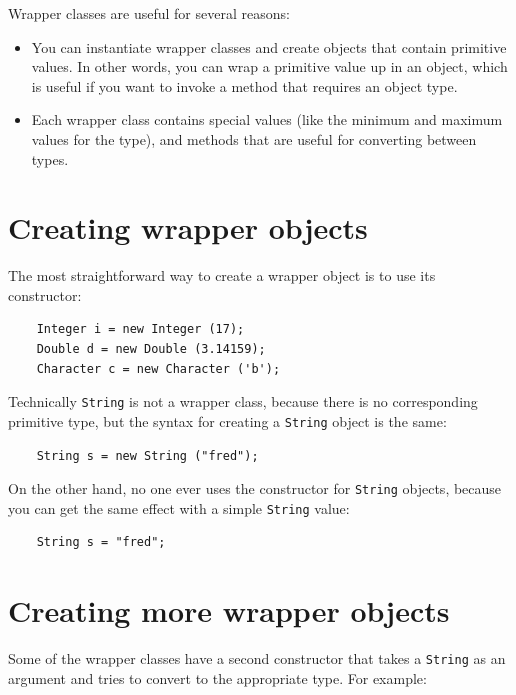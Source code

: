 \documentclass[12pt]{book}
\theoremstyle{exercise}
\begin{document}
Wrapper classes are useful for several reasons:

\begin{itemize}

\item You can instantiate wrapper classes and create objects
that contain primitive values.  In other words, you can wrap
a primitive value up in an object, which is useful if you want
to invoke a method that requires an object type.

\item Each wrapper class contains special values (like the
minimum and maximum values for the type), and methods that are useful
for converting between types.

\end{itemize}


\section {Creating wrapper objects}

The most straightforward way to create a wrapper object is
to use its constructor:

\begin{verbatim}
    Integer i = new Integer (17);
    Double d = new Double (3.14159);
    Character c = new Character ('b');
\end{verbatim}
%
Technically {\tt String} is not a wrapper class, because there
is no corresponding primitive type, but the syntax for creating
a {\tt String} object is the same:

\begin{verbatim}
    String s = new String ("fred");
\end{verbatim}
%
On the other hand, no one ever uses the constructor for
{\tt String} objects, because you can get the same effect
with a simple {\tt String} value:

\begin{verbatim}
    String s = "fred";
\end{verbatim}


\section {Creating more wrapper objects}

Some of the wrapper classes have a second constructor that takes
a {\tt String} as an argument and tries to convert
to the appropriate type.  For example:
\end{document}
